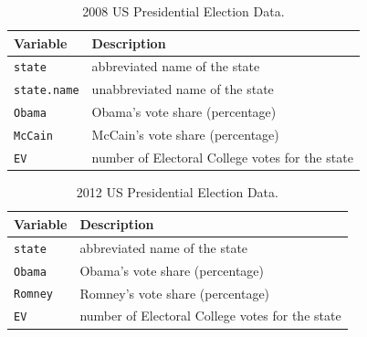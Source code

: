 \documentclass[12pt]{article}
\begin{document}
\begin{table}[h!]
\centering
\caption{2008 US Presidential Election Data.}
\label{table:election_2008}
\begin{tabular}{ll}
\hline
\textbf{Variable} & \textbf{Description} \\ \hline
\texttt{state} & abbreviated name of the state \\ 
\texttt{state.name} & unabbreviated name of the state \\ 
\texttt{Obama} & Obama’s vote share (percentage) \\ 
\texttt{McCain} & McCain’s vote share (percentage) \\ 
\texttt{EV} & number of Electoral College votes for the state \\ \hline
\end{tabular}
\end{table}

\begin{table}[h!]
\centering
\caption{2012 US Presidential Election Data.}
\label{table:election_2012}
\begin{tabular}{ll}
\hline
\textbf{Variable} & \textbf{Description} \\ \hline
\texttt{state} & abbreviated name of the state \\ 
\texttt{Obama} & Obama’s vote share (percentage) \\ 
\texttt{Romney} & Romney’s vote share (percentage) \\ 
\texttt{EV} & number of Electoral College votes for the state \\ \hline
\end{tabular}
\end{table}
\end{document}
